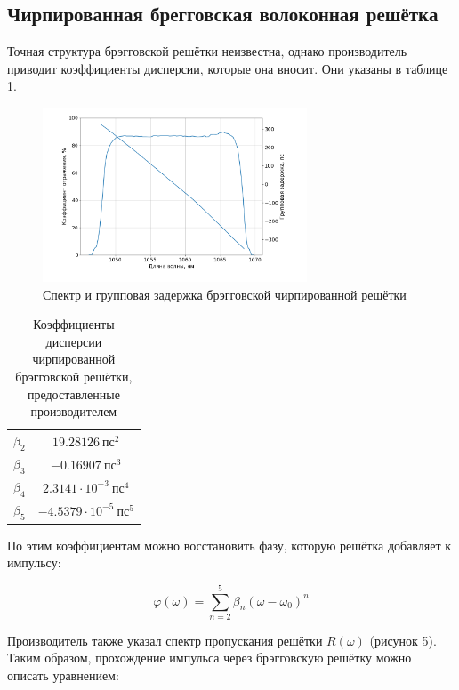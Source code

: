 \documentclass[12pt]{article}
\begin{document}
\subsection{Чирпированная брегговская волоконная решётка}

Точная структура брэгговской решётки неизвестна, однако производитель приводит коэффициенты дисперсии, которые она
вносит. Они указаны в таблице 1.

\begin{figure}[h]
    \centering
    \includegraphics[trim=0 50 0 0, width=0.7\textwidth]{Images/Спектр решётки.png}
    \caption{Спектр и групповая задержка брэгговской чирпированной решётки}
    \label{fig:rotated}
\end{figure}

\begin{table}[h!]
    \centering
    \begin{tabular}{|c|c|}
        \hline
        $\beta_2$ & $19{.}28126~\text{пс}^2$ \\
        $\beta_3$ & $-0{.}16907~\text{пс}^3$ \\
        $\beta_4$ & $2{.}3141 \cdot 10^{-3}~\text{пс}^4$ \\
        $\beta_5$ & $-4{.}5379 \cdot 10^{-5}~\text{пс}^5$ \\
        \hline
    \end{tabular}
    \caption{Коэффициенты дисперсии чирпированной брэгговской решётки, предоставленные производителем}
    \label{tabюexample}
\end{table}

По этим коэффициентам можно восстановить фазу, которую решётка добавляет к импульсу:

\begin{equation}
    \varphi(\omega) = \sum_{n=2}^{5} \beta_n (\omega - \omega_0)^n
\end{equation}

Производитель также указал спектр пропускания решётки $R(\omega)$ (рисунок 5). Таким образом, прохождение импульса через
брэгговскую решётку можно описать уравнением:
\end{document}
